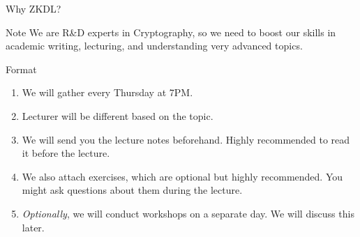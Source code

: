 \documentclass{beamer}
\begin{document}
\begin{frame}{Why ZKDL?}
        \begin{alertblock}{Note}
          We are R\&D experts in Cryptography, so we need to boost our skills in academic writing, lecturing, and understanding very advanced topics.
        \end{alertblock}
    \end{frame}

    \begin{frame}{Format}
      \begin{enumerate}
        \item We will gather every Thursday at 7PM.
        \item Lecturer will be different based on the topic.
        \item We will send you the lecture notes beforehand. Highly recommended to read it before the lecture.
        \item We also attach exercises, which are optional but highly recommended. You might ask questions about them during the lecture.
        \item \textit{Optionally}, we will conduct workshops on a separate day. We will discuss this later.
      \end{enumerate}
    \end{frame}
\end{document}
